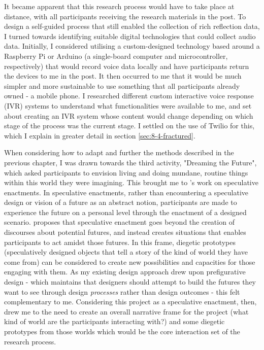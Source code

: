 It became apparent that this research process would have to take place at distance, with all participants receiving the research materials in the post. To design a self-guided process that still enabled the collection of rich reflection data, I turned towards identifying suitable digital technologies that could collect audio data. Initially, I considered utilising a custom-designed technology based around a Raspberry Pi or Arduino (a single-board computer and microcontroller, respectively) that would record voice data locally and have participants return the devices to me in the post. It then occurred to me that it would be much simpler and more sustainable to use something that all participants already owned - a mobile phone. I researched different custom interactive voice response (IVR) systems to understand what functionalities were available to me, and set about creating an IVR system whose content would change depending on which stage of the process was the current stage. I settled on the use of Twilio for this, which I explain in greater detail in section \ref{sec:8-4-fractured}. 

When considering how to adapt and further the methods described in the previous chapter, I was drawn towards the third activity, "Dreaming the Future", which asked participants to envision living and doing mundane, routine things within this world they were imagining. This brought me to \citet{elsden_speculative_2017}'s work on speculative enactments. In speculative enactments, rather than encountering a speculative design or vision of a future as an abstract notion, participants are made to experience the future on a personal level through the enactment of a designed scenario. \citet{elsden_speculative_2017} proposes that speculative enactment goes beyond the creation of discourses about potential futures, and instead creates situations that enables participants to act amidst those futures. In this frame, diegetic prototypes  \citep{kirby_future_2010} (speculatively designed objects that tell a story of the kind of world they have come from) can be considered to create new possibilities and capacities for those engaging with them. As my existing design approach drew upon prefigurative design \citep{asad_prefigurative_2018, asad_prefigurative_2019, asad_tap_2017} - which maintains that designers should attempt to build the futures they want to see through design \textit{processes} rather than design outcomes - this felt complementary to me. Considering this project as a speculative enactment, then, drew me to the need to create an overall narrative frame for the project (what kind of world are the participants interacting with?) and some diegetic prototypes from those worlds which would be the core interaction set of the research process. 

